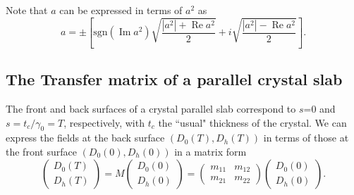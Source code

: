\documentclass{iucr}
\begin{document}
Note that $a$ can be expressed in terms of $a^2$ as
\begin{equation}\label{eq:asigned}
    a = \pm \left[ \text{sgn}(\operatorname{Im}a^2)\sqrt{\frac{|a^2| + \operatorname{Re} a^2}{2}} + i \sqrt{\frac{|a^2|-\operatorname{Re}a^2}{2}} \right].
\end{equation}




\subsection{The Transfer matrix of a parallel crystal slab}
\label{sec:transferMatrix}

The front and back surfaces of a crystal parallel slab correspond to $s$=0 and $s=t_c/\gamma_0=T$, respectively, with $t_c$ the ``usual" thickness of the crystal.
We can express the fields at the back surface $(D_0(T),D_h(T))$ in terms of those at the front surface $(D_0(0),D_h(0))$ in a matrix form
\begin{equation}\label{eq:Mtransfer}
    \begin{pmatrix}
    D_0(T)\\
    D_h(T)
    \end{pmatrix}
    =
    M
        \begin{pmatrix}
    D_0(0) \\
    D_h(0)
    \end{pmatrix}
    =
    \begin{pmatrix}
    m_{11} & m_{12}\\
    m_{21} & m_{22}
    \end{pmatrix}
    \begin{pmatrix}
    D_0(0) \\
    D_h(0)
    \end{pmatrix}.
\end{equation}
\end{document}
